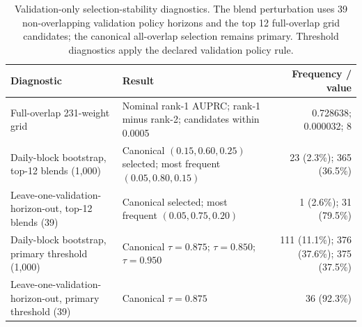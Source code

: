\begin{table}[!t]
\caption{Validation-only selection-stability diagnostics. The blend perturbation uses 39 non-overlapping validation policy horizons and the top 12 full-overlap grid candidates; the canonical all-overlap selection remains primary. Threshold diagnostics apply the declared validation policy rule.}
\label{tab:selection-stability}
\centering
\scriptsize
\setlength{\tabcolsep}{2pt}
\begin{tabular}{p{}p{}r}
\toprule
Diagnostic & Result & Frequency / value \\
\midrule
Full-overlap 231-weight grid & Nominal rank-1 AUPRC; rank-1 minus rank-2; candidates within 0.0005 & 0.728638; 0.000032; 8 \\
Daily-block bootstrap, top-12 blends (1,000) & Canonical $(0.15,0.60,0.25)$ selected; most frequent $(0.05,0.80,0.15)$ & 23 (2.3\%); 365 (36.5\%) \\
Leave-one-validation-horizon-out, top-12 blends (39) & Canonical selected; most frequent $(0.05,0.75,0.20)$ & 1 (2.6\%); 31 (79.5\%) \\
Daily-block bootstrap, primary threshold (1,000) & Canonical $\tau=0.875$; $\tau=0.850$; $\tau=0.950$ & 111 (11.1\%); 376 (37.6\%); 375 (37.5\%) \\
Leave-one-validation-horizon-out, primary threshold (39) & Canonical $\tau=0.875$ & 36 (92.3\%) \\
\bottomrule
\end{tabular}
\end{table}
